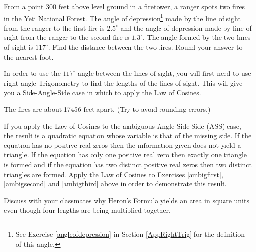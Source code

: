 \documentclass{ximera}
\begin{document}
\begin{problem}
From a point 300 feet above level ground in a firetower, a ranger spots two fires in the Yeti National Forest.  The angle of depression\footnote{See Exercise \ref{angleofdepression} in Section \ref{AppRightTrig} for the definition of this angle.} made by the line of sight from the ranger to the first fire is $2.5^{\circ}$ and the angle of depression made by line of sight from the ranger to the second fire is $1.3^{\circ}$.  The angle formed by the two lines of sight is $117^{\circ}$.  Find the distance between the two fires.  Round your answer to the nearest foot. 

\begin{image}
\end{image}

\begin{hint}
In order to use the $117^{\circ}$ angle between the lines of sight, you will first need to use right angle Trigonometry to find the lengths of the lines of sight.  This will give you a Side-Angle-Side case in which to apply the Law of Cosines.
\end{hint}

\begin{solution}
The fires are about 17456 feet apart. (Try to avoid rounding errors.)
\end{solution}
\end{problem}

\begin{problem}
If you apply the Law of Cosines to the ambiguous Angle-Side-Side (ASS) case, the result is a quadratic equation whose variable is that of the missing side. If the equation has no positive real zeros then the information given does not yield a triangle.  If the equation has only one positive real zero then exactly one triangle is formed and if the equation has two distinct positive real zeros then two distinct triangles are formed.  Apply the Law of Cosines to Exercises \ref{ambigfirst}, \ref{ambigsecond} and \ref{ambigthird} above in order to demonstrate this result. 
\end{problem}

\begin{problem}
Discuss with your classmates why Heron's Formula yields an area in square units even though four lengths are being multiplied together.
\end{problem}
\end{document}
